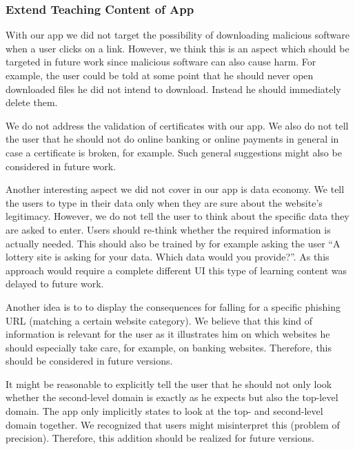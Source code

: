 \subsubsection{Extend Teaching Content of App}
\begin{description}[leftmargin=0cm]
\item[Malicious Downloads:] With our app we did not target the possibility of downloading malicious software when a user clicks on a link.
	However, we think this is an aspect which should be targeted in future work since malicious software can also cause harm.
	For example, the user could be told at some point that he should never open downloaded files he did not intend to download.
	Instead he should immediately delete them.
	\item[Certificate Validation:] We do not address the validation of certificates with our app. We also do not tell the user that he should not do online banking or online payments in general in case a certificate is broken, for example.
	Such general suggestions might also be considered in future work.
	\item[Data Economy:] Another interesting aspect we did not cover in our app is data economy.
	We tell the users to type in their data only when they are sure about the website's legitimacy.
	However, we do not tell the user to think about the specific data they are asked to enter.
	Users should re-think whether the required information is actually needed.
	This should also be trained by for example asking the user ``A lottery site is asking for your data. Which data would you provide?''. As this approach would require a complete different UI this type of learning content was delayed to future work.
	\item[Consequences:] Another idea is to to display the consequences for falling for a specific phishing URL (matching a certain website category).
We believe that this kind of information is relevant for the user as it illustrates him on which websites he should especially take care, for example, on banking websites. Therefore, this should be considered in future versions.
	\item[Top-Level Domain Attacks:] It might be reasonable to explicitly tell the user that he should not only look whether the second-level domain is exactly as he expects but also the top-level domain. The app only implicitly states to look at the top- and second-level domain together.
We recognized that users might misinterpret this (problem of precision).
Therefore, this addition should be realized for future versions.

\end{description}
